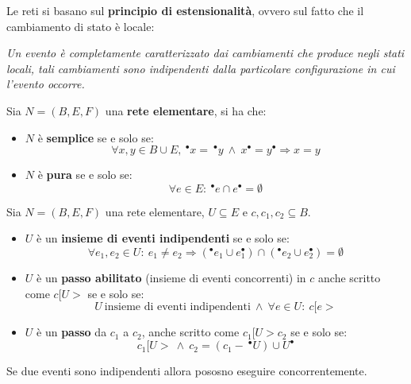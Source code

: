 Le reti si basano sul \textbf{principio di estensionalità}, ovvero sul fatto che
il cambiamento di stato è locale:
\begin{center}
    \textit{Un evento è completamente caratterizzato dai cambiamenti che produce
        negli stati locali, tali cambiamenti sono indipendenti dalla particolare
        configurazione in cui l'evento occorre.}
\end{center}
\begin{definizione}[]
    Sia $N = (B, E, F)$ una \textbf{rete elementare}, si ha che:
    \begin{itemize}
        \item $N$ è \textbf{semplice} se e solo se:
              \begin{equation}
                  \forall x, y \in B \cup E, \ ^{\bullet} x = \ ^{\bullet} y \
                  \land \ x^{\bullet} = y^{\bullet} \Rightarrow x = y
              \end{equation}
        \item $N$ è \textbf{pura} se e solo se:
              \begin{equation}
                  \forall e \in E: \ ^{\bullet}e \cap e^{\bullet} = \emptyset
              \end{equation}
    \end{itemize}
\end{definizione}
\begin{definizione}
    Sia $N = (B, E, F)$ una rete elementare, $U \subseteq E$ e $c, c_1, c_2 \subseteq B$.
    \begin{itemize}
        \item $U$ è un \textbf{insieme di eventi indipendenti} se e solo se:
              \begin{equation}
                  \forall e_1, e_2 \in U: \ e_1 \neq e_2 \Rightarrow (^{\bullet}e_1
                  \cup e_1^{\bullet}) \cap (^{\bullet}e_2 \cup e_2^{\bullet}) = \emptyset
              \end{equation}
        \item $U$ è un \textbf{passo abilitato} (insieme di eventi concorrenti)
              in $c$ anche scritto come $c[U >$ se e solo se:
              \begin{equation}
                  U \ \text{insieme di eventi indipendenti} \ \land \ \forall e
                  \in U: \ c[e >
              \end{equation}
        \item $U$ è un \textbf{passo} da $c_1$ a $c_2$, anche scritto come
              $c_1[U > c_2$ se e solo se:
              \begin{equation}
                  c_1 [ U > \ \land \ c_2 = (c_1 - \ ^{\bullet} U) \cup U^{\bullet}
              \end{equation}
    \end{itemize}
    Se due eventi sono indipendenti allora pososno eseguire concorrentemente.
\end{definizione}
